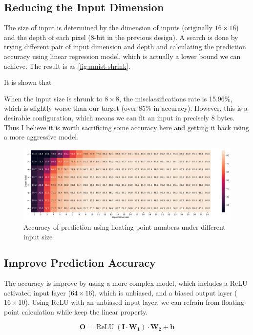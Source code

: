 
\subsection{Reducing the Input Dimension}

The size of input is determined by the dimension of inputs (originally \(16 \times 16\)) and the depth of each pixel (8-bit in the previous design).
A search is done by trying different pair of input dimension and depth and calculating the prediction accuracy using linear regression model, which is actually a lower bound we can achieve.
The result is as \autoref{fig:mnist-shrink}.

It is shown that 

When the input size is shrunk to \(8 \times 8\), the misclassifications rate is 15.96\%, which is slightly worse than our target (over 85\% in accuracy).
However, this is a desirable configuration, which means we can fit an input in precisely 8 bytes.
Thus I believe it is worth sacrificing some accuracy here and getting it back using a more aggressive model.

\begin{figure}[ht!]
    \centering
    \includegraphics[width=\textwidth]{images/mnist-shrink.pdf}
    \caption{Accuracy of prediction using floating point numbers under different input size}
    \label{fig:mnist-shrink}
\end{figure}

\subsection{Improve Prediction Accuracy}

The accuracy is improve by using a more complex model, which includes a ReLU activated input layer (\(64 \times 16\)), which is unbiased, and a biased output layer (\(16\times 10\)).
Using ReLU with an unbiased input layer, we can refrain from floating point calculation while keep the linear property.

\[
    \mathbf{O} = \operatorname{ReLU}(\mathbf{I} \cdot \mathbf{W_1}) \cdot \mathbf{W_2} + \mathbf{b}
\]

